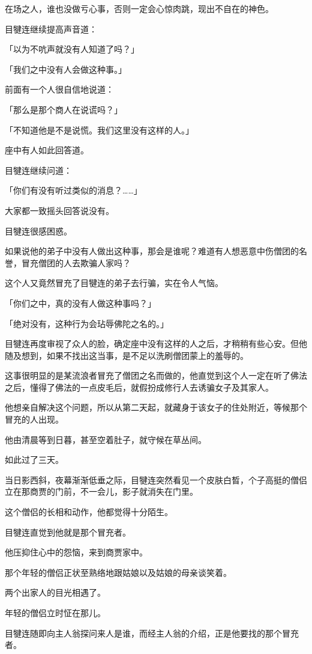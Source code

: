 \documentclass[twoside,openany]{book}
\begin{document}
在场之人，谁也没做亏心事，否则一定会心惊肉跳，现出不自在的神色。

目犍连继续提高声音道：

「以为不吭声就没有人知道了吗？」

「我们之中没有人会做这种事。」

前面有一个人很自信地说道：

「那么是那个商人在说谎吗？」

「不知道他是不是说慌。我们这里没有这样的人。」

座中有人如此回答道。

目犍连继续问道：

「你们有没有听过类似的消息？……」

大家都一致摇头回答说没有。

目犍连很感困惑。

如果说他的弟子中没有人做出这种事，那会是谁呢？难道有人想恶意中伤僧团的名誉，冒充僧团的人去欺骗人家吗？

这个人又竟然冒充了目犍连的弟子去行骗，实在令人气恼。

「你们之中，真的没有人做这种事吗？」

「绝对没有，这种行为会玷辱佛陀之名的。」

目犍连再度审视了众人的脸，确定座中没有这样的人之后，才稍稍有些心安。但他随及想到，如果不找出这当事，是不足以洗刷僧团蒙上的羞辱的。

这事很明显的是某流浪者冒充了僧团之名而做的，他直觉到这个人一定在听了佛法之后，懂得了佛法的一点皮毛后，就假扮成修行人去诱骗女子及其家人。

他想亲自解决这个问题，所以从第二天起，就藏身于该女子的住处附近，等候那个冒充的人出现。

他由清晨等到日暮，甚至空着肚子，就守候在草丛间。

如此过了三天。

当日影西斜，夜幕渐渐低垂之际，目犍连突然看见一个皮肤白晳，个子高挺的僧侣立在那商贾的门前，不一会儿，影子就消失在门里。

这个僧侣的长相和动作，他都觉得十分陌生。

目犍连直觉到他就是那个冒充者。

他压抑住心中的怨恼，来到商贾家中。

那个年轻的僧侣正状至熟络地跟姑娘以及姑娘的母亲谈笑着。

两个出家人的目光相遇了。

年轻的僧侣立时怔在那儿。

目犍连随即向主人翁探问来人是谁，而经主人翁的介绍，正是他要找的那个冒充者。
\end{document}
